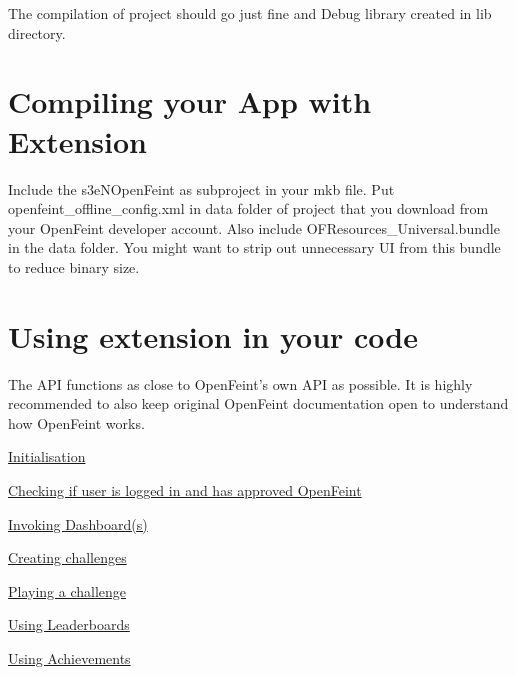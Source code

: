The compilation of project should go just fine and Debug library created in lib directory.\hypertarget{main_sec_3}{}\section{Compiling your App with Extension}\label{main_sec_3}
Include the s3eNOpenFeint as subproject in your mkb file. Put openfeint\_\-offline\_\-config.xml in data folder of project that you download from your OpenFeint developer account. Also include OFResources\_\-Universal.bundle in the data folder. You might want to strip out unnecessary UI from this bundle to reduce binary size.\hypertarget{main_sec_4}{}\section{Using extension in your code}\label{main_sec_4}
The API functions as close to OpenFeint's own API as possible. It is highly recommended to also keep original OpenFeint documentation open to understand how OpenFeint works.

\hyperlink{main_sec_4_1}{Initialisation}

\hyperlink{main_sec_4_2}{Checking if user is logged in and has approved OpenFeint}

\hyperlink{main_sec_4_3}{Invoking Dashboard(s)}

\hyperlink{main_sec_4_4}{Creating challenges}

\hyperlink{main_sec_4_5}{Playing a challenge}

\hyperlink{main_sec_4_6}{Using Leaderboards}

\hyperlink{main_sec_4_7}{Using Achievements}

